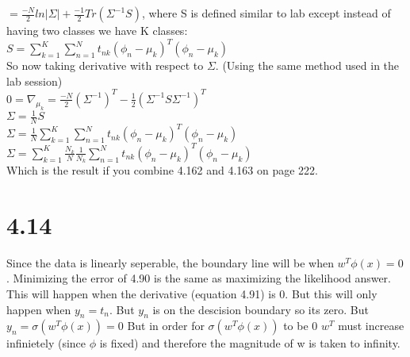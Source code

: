 \documentclass[11pt,leqno,fleqn]{article}
\begin{document}
$=  \frac{-N}{2}  ln|\Sigma| +  \frac{-1}{2} Tr(\Sigma^{-1}S)$, where S is defined similar to lab except instead of having two classes we have K classes:\\
$S =  \sum_{k =1}^K  \sum_{n=1}^N  {t_{nk}} (\phi_n - \mu_k)^T(\phi_n - \mu_k) $  \\
So now taking derivative with respect to $\Sigma$. (Using the same method used in the lab session)\\
$ 0  = \nabla_{\mu_k} = \frac{-N}{2}(\Sigma^{-1})^T - \frac{1}{2}(\Sigma^{-1}S \Sigma^{-1})^T$\\
$\Sigma  = \frac{1}{N} S$\\
$\Sigma  = \frac{1}{N} \sum_{k =1}^K  \sum_{n=1}^N  {t_{nk}} (\phi_n - \mu_k)^T(\phi_n - \mu_k)  $\\
$\Sigma  = \sum_{k =1}^K \frac{N_k}{N} \frac{1}{N_k}  \sum_{n=1}^N  {t_{nk}} (\phi_n - \mu_k)^T(\phi_n - \mu_k)  $\\
Which is the result if you combine 4.162 and 4.163 on page 222.


\section{4.14}
Since the data is linearly seperable, the boundary line will be when $w^T \phi(x) = 0$. 
Minimizing the error of 4.90 is the same as maximizing the likelihood answer.  This will happen when the derivative (equation 4.91) is 0.  But this will only
happen when $y_n = t_n$. But $y_n$ is on the descision boundary so its zero. But $y_n = \sigma(w^T \phi(x)) = 0$ But in order for $\sigma ( w^T \phi(x))$ to be 0 $w^T$ must increase infinietely (since $\phi$ is fixed) and therefore the magnitude of w is taken to infinity.
\end{document}
